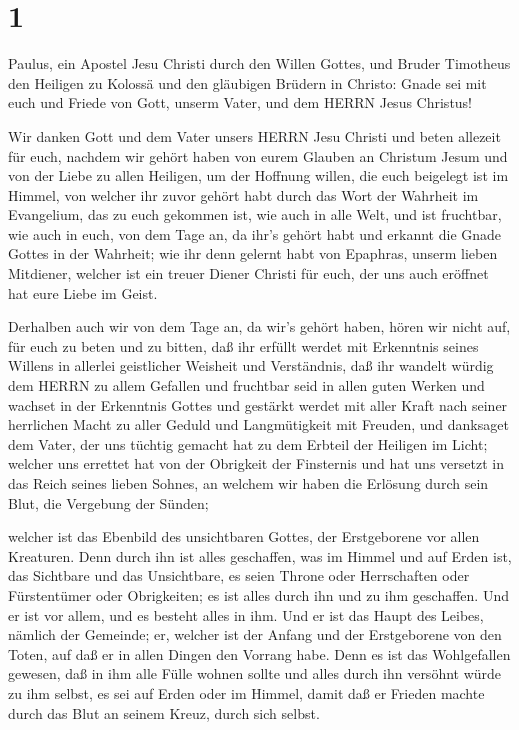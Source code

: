 \hypertarget{section}{%
\section{1}\label{section}}

 Paulus, ein Apostel Jesu Christi durch den Willen Gottes,
und Bruder Timotheus  den Heiligen zu Kolossä und den
gläubigen Brüdern in Christo: Gnade sei mit euch und Friede von Gott,
unserm Vater, und dem HERRN Jesus Christus!

 Wir danken Gott und dem Vater unsers HERRN Jesu Christi und
beten allezeit für euch,  nachdem wir gehört haben von eurem
Glauben an Christum Jesum und von der Liebe zu allen Heiligen,
 um der Hoffnung willen, die euch beigelegt ist im Himmel,
von welcher ihr zuvor gehört habt durch das Wort der Wahrheit im
Evangelium,  das zu euch gekommen ist, wie auch in alle
Welt, und ist fruchtbar, wie auch in euch, von dem Tage an, da ihr's
gehört habt und erkannt die Gnade Gottes in der Wahrheit; 
wie ihr denn gelernt habt von Epaphras, unserm lieben Mitdiener, welcher
ist ein treuer Diener Christi für euch,  der uns auch
eröffnet hat eure Liebe im Geist.

 Derhalben auch wir von dem Tage an, da wir's gehört haben,
hören wir nicht auf, für euch zu beten und zu bitten, daß ihr erfüllt
werdet mit Erkenntnis seines Willens in allerlei geistlicher Weisheit
und Verständnis,  daß ihr wandelt würdig dem HERRN zu allem
Gefallen und fruchtbar seid in allen guten Werken  und
wachset in der Erkenntnis Gottes und gestärkt werdet mit aller Kraft
nach seiner herrlichen Macht zu aller Geduld und Langmütigkeit mit
Freuden,  und danksaget dem Vater, der uns tüchtig gemacht
hat zu dem Erbteil der Heiligen im Licht;  welcher uns
errettet hat von der Obrigkeit der Finsternis und hat uns versetzt in
das Reich seines lieben Sohnes,  an welchem wir haben die
Erlösung durch sein Blut, die Vergebung der Sünden;

 welcher ist das Ebenbild des unsichtbaren Gottes, der
Erstgeborene vor allen Kreaturen.  Denn durch ihn ist alles
geschaffen, was im Himmel und auf Erden ist, das Sichtbare und das
Unsichtbare, es seien Throne oder Herrschaften oder Fürstentümer oder
Obrigkeiten; es ist alles durch ihn und zu ihm geschaffen. 
Und er ist vor allem, und es besteht alles in ihm.  Und er
ist das Haupt des Leibes, nämlich der Gemeinde; er, welcher ist der
Anfang und der Erstgeborene von den Toten, auf daß er in allen Dingen
den Vorrang habe.  Denn es ist das Wohlgefallen gewesen,
daß in ihm alle Fülle wohnen sollte  und alles durch ihn
versöhnt würde zu ihm selbst, es sei auf Erden oder im Himmel, damit daß
er Frieden machte durch das Blut an seinem Kreuz, durch sich selbst.

